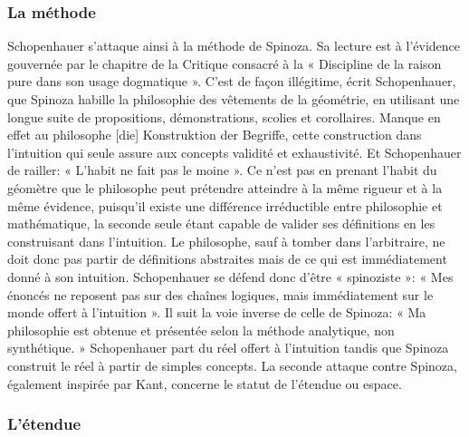 \subsubsection{La méthode}

Schopenhauer s’attaque ainsi à la méthode de Spinoza. Sa lecture est à l’évidence gouvernée par le chapitre
de la Critique consacré à la « Discipline de la raison pure dans son usage dogmatique ». C’est de façon
illégitime, écrit Schopenhauer, que Spinoza habille la philosophie des vêtements de la géométrie, en utilisant
une longue suite de propositions, démonstrations, scolies et corollaires. Manque en effet au philosophe [die]
Konstruktion der Begriffe, cette construction dans l’intuition qui seule assure aux concepts validité et
exhaustivité. Et Schopenhauer de railler: « L’habit ne fait pas le moine ». Ce n’est
pas en prenant l’habit du géomètre que le philosophe peut prétendre atteindre à la même rigueur et à la même
évidence, puisqu’il existe une différence irréductible entre philosophie et mathématique, la seconde seule
étant capable de valider ses définitions en les construisant dans l’intuition. Le philosophe, sauf à tomber dans
l’arbitraire, ne doit donc pas partir de définitions abstraites mais de ce qui est immédiatement donné à son
intuition.
Schopenhauer se défend donc d’être « spinoziste »: « Mes énoncés ne reposent pas sur des chaînes
logiques, mais immédiatement sur le monde offert à l’intuition ». Il suit la voie inverse de celle
de Spinoza: « Ma philosophie est obtenue et présentée selon la méthode analytique, non synthétique. »
Schopenhauer part du réel offert à l’intuition tandis que Spinoza construit le réel à partir de simples concepts.
La seconde attaque contre Spinoza, également inspirée par Kant, concerne le statut de l’étendue ou espace.

\subsubsection{L’étendue}

